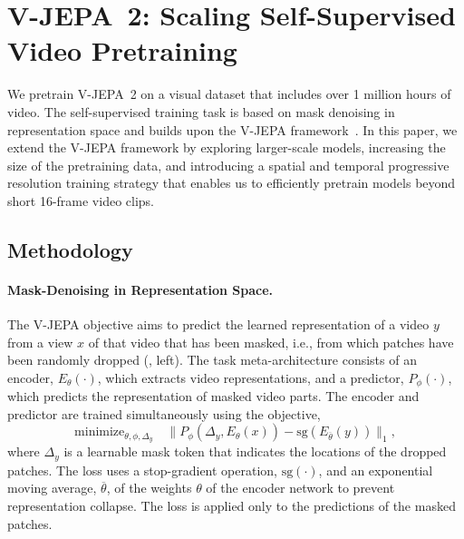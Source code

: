 \documentclass[]{kling/kling}
\newcommand{\model}{V-JEPA~2\xspace}
\begin{document}
\section{V-JEPA~2: Scaling Self-Supervised Video Pretraining}
\label{section:stage1}

We pretrain \model on a visual dataset that includes over 1 million hours of video. The self-supervised training task is based on mask denoising in representation space and builds upon the V-JEPA framework~\citep{bardes2024revisiting}. In this paper, we extend the V-JEPA framework by exploring larger-scale models, increasing the size of the pretraining data, and introducing a spatial and temporal progressive resolution training strategy that enables us to efficiently pretrain models beyond short 16-frame video clips.


\subsection{Methodology}

\paragraph{\bf Mask-Denoising in Representation Space.}
The V-JEPA objective aims to predict the learned representation of a video $y$ from a view $x$ of that video that has been masked, i.e., from which patches have been randomly dropped (, left). The task meta-architecture consists of an encoder, $E_\theta(\cdot)$, which extracts video representations, and a predictor, $P_\phi(\cdot)$, which predicts the representation of masked video parts. The encoder and predictor are trained simultaneously using the objective,
\begin{equation}
\label{eq:loss}
\text{minimize}_{\theta,\phi, \Delta_y}\quad \lVert P_\phi(\Delta_y, E_\theta(x)) - \text{sg}(E_{\overline\theta}(y)) \rVert_1,
\end{equation}
where $\Delta_y$ is a learnable mask token that indicates the locations of the dropped patches. The loss uses a stop-gradient operation, $\text{sg}(\cdot)$, and an exponential moving average, $\overline \theta$, of the weights $\theta$ of the encoder network to prevent representation collapse. The loss is applied only to the predictions of the masked patches.
\end{document}
